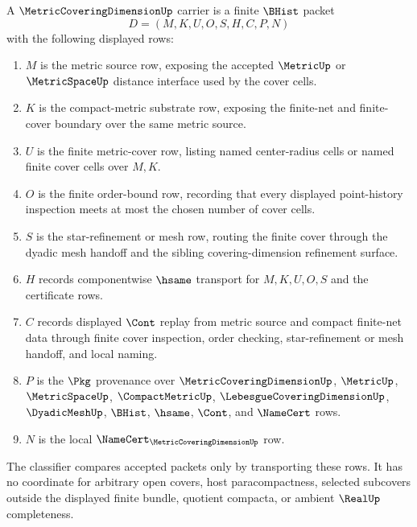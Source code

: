 \begin{definition}
\label{def:metric-covering-dimension-carrier}
A $\MetricCoveringDimensionUp$ carrier is a finite $\BHist$ packet
$$
D=(M,K,U,O,S,H,C,P,N)
$$
with the following displayed rows:
\begin{enumerate}
\item $M$ is the metric source row, exposing the accepted $\MetricUp$ or $\MetricSpaceUp$ distance interface used by the cover cells.
\item $K$ is the compact-metric substrate row, exposing the finite-net and finite-cover boundary over the same metric source.
\item $U$ is the finite metric-cover row, listing named center-radius cells or named finite cover cells over $M,K$.
\item $O$ is the finite order-bound row, recording that every displayed point-history inspection meets at most the chosen number of cover cells.
\item $S$ is the star-refinement or mesh row, routing the finite cover through the dyadic mesh handoff and the sibling covering-dimension refinement surface.
\item $H$ records componentwise $\hsame$ transport for $M,K,U,O,S$ and the certificate rows.
\item $C$ records displayed $\Cont$ replay from metric source and compact finite-net data through finite cover inspection, order checking, star-refinement or mesh handoff, and local naming.
\item $P$ is the $\Pkg$ provenance over $\MetricCoveringDimensionUp$, $\MetricUp$, $\MetricSpaceUp$, $\CompactMetricUp$, $\LebesgueCoveringDimensionUp$, $\DyadicMeshUp$, $\BHist$, $\hsame$, $\Cont$, and $\NameCert$ rows.
\item $N$ is the local $\NameCert_{\MetricCoveringDimensionUp}$ row.
\end{enumerate}
The classifier compares accepted packets only by transporting these rows. It has no coordinate for arbitrary open covers, host paracompactness, selected subcovers outside the displayed finite bundle, quotient compacta, or ambient $\RealUp$ completeness.
\end{definition}


